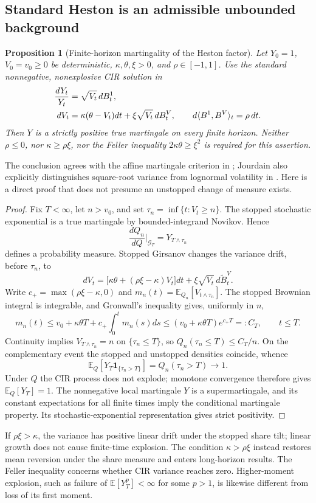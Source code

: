 \documentclass[11pt,a4paper]{article}
\numberwithin{equation}{section}
\newtheorem{proposition}[theorem]{Proposition}
\theoremstyle{definition}\newtheorem{definition}[theorem]{Definition}
\theoremstyle{remark}\newtheorem{remark}[theorem]{Remark}
\newcommand{\E}{\mathbb E}\newcommand{\R}{\mathbb R}
\newcommand{\ind}{\mathbf 1}\newcommand{\diag}{\operatorname{diag}}
\begin{document}
\subsection{Standard Heston is an admissible unbounded background}
\label{sec:heston-certificate}
\begin{proposition}[Finite-horizon martingality of the Heston factor]
\label{prop:heston-true}
Let $Y_0=1$, $V_0=v_0\geq0$ be deterministic, $\kappa,\theta,\xi>0$, and $\rho\in[-1,1]$. Use the standard nonnegative, nonexplosive CIR solution in
\begin{align}
 \frac{dY_t}{Y_t}&=\sqrt{V_t}\,dB_t^1,\notag\\
 dV_t&=\kappa(\theta-V_t)dt+\xi\sqrt{V_t}\,dB_t^V,
 \qquad d\langle B^1,B^V\rangle_t=\rho\,dt.
 \label{eq:heston-smoothing}
\end{align}
Then $Y$ is a strictly positive true martingale on every finite horizon. Neither $\rho\leq0$, nor $\kappa\geq\rho\xi$, nor the Feller inequality $2\kappa\theta\geq\xi^2$ is required for this assertion.
\end{proposition}
The conclusion agrees with the affine martingale criterion in \cite[Corollary~2.7 and Section~6.1]{MomentExplosion}; Jourdain also explicitly distinguishes square-root variance from lognormal volatility in \cite[Remark~2]{Jourdain2004}. Here is a direct proof that does not presume an unstopped change of measure exists.
\begin{proof}
Fix $T<\infty$, let $n>v_0$, and set $\tau_n=\inf\{t:V_t\geq n\}$. The stopped stochastic exponential is a true martingale by bounded-integrand Novikov. Hence
\[
 \frac{dQ_n}{dQ}\bigg|_{\mathcal G_T}=Y_{T\wedge\tau_n}
\]
defines a probability measure. Stopped Girsanov changes the variance drift, before $\tau_n$, to
\[
 dV_t=\bigl[\kappa\theta+(\rho\xi-\kappa)V_t\bigr]dt
       +\xi\sqrt{V_t}\,d\widetilde B_t^V.
\]
Write $c_+=\max(\rho\xi-\kappa,0)$ and
$m_n(t)=\E_{Q_n}[V_{t\wedge\tau_n}]$. The stopped Brownian integral is integrable, and Gronwall's inequality gives, uniformly in $n$,
\[
 m_n(t)\leq v_0+\kappa\theta T+c_+\int_0^t m_n(s)ds
 \leq (v_0+\kappa\theta T)e^{c_+T}=:C_T,
 \qquad t\leq T.
\]
Continuity implies $V_{T\wedge\tau_n}=n$ on $\{\tau_n\leq T\}$, so
$Q_n(\tau_n\leq T)\leq C_T/n$. On the complementary event the stopped and unstopped densities coincide, whence
\[
 \E_Q[Y_T\ind_{\{\tau_n>T\}}]
 =Q_n(\tau_n>T)\longrightarrow1.
\]
Under $Q$ the CIR process does not explode; monotone convergence therefore gives $\E_Q[Y_T]=1$. The nonnegative local martingale $Y$ is a supermartingale, and its constant expectations for all finite times imply the conditional martingale property. Its stochastic-exponential representation gives strict positivity.
\end{proof}
If $\rho\xi>\kappa$, the variance has positive linear drift under the stopped share tilt; linear growth does not cause finite-time explosion. The condition $\kappa>\rho\xi$ instead restores mean reversion under the share measure and enters long-horizon results. The Feller inequality concerns whether CIR variance reaches zero. Higher-moment explosion, such as failure of $\E[Y_T^p]<\infty$ for some $p>1$, is likewise different from loss of its first moment.
\end{document}
